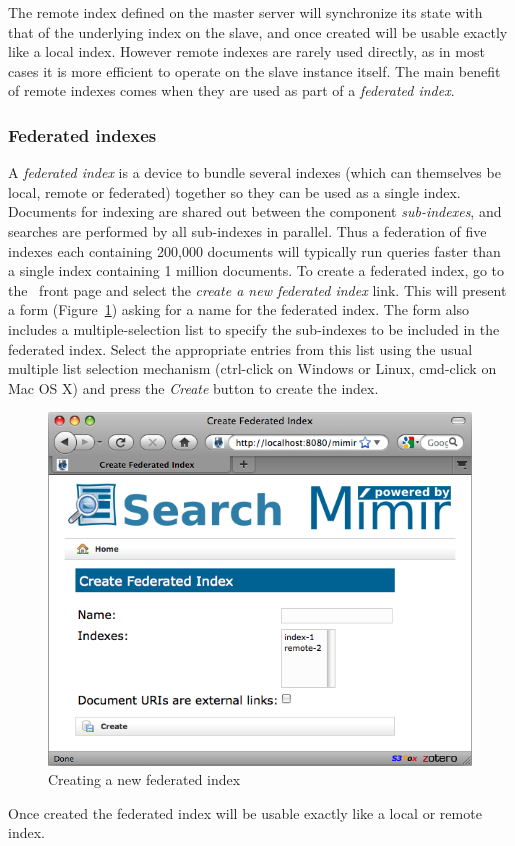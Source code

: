 The remote index defined on the master server will synchronize its state with
that of the underlying index on the slave, and once created will be usable
exactly like a local index.  However remote indexes are rarely used directly,
as in most cases it is more efficient to operate on the slave instance
itself.  The main benefit of remote indexes comes when they are used as part
of a {\em federated index}.

\subsubsection{Federated indexes}

A {\em federated index} is a device to bundle several indexes (which can
themselves be local, remote or federated) together so they can be used as a
single index.  Documents for indexing are shared out between the component
{\em sub-indexes}, and searches are performed by all sub-indexes in parallel.
Thus a federation of five indexes each containing 200,000 documents will
typically run queries faster than a single index containing 1 million
documents.  To create a federated index, go to the \Mimir\ front page and
select the {\em create a new federated index} link.  This will present a form
(Figure~\ref{fig:new-federated-index}) asking for a name for the federated
index.  The form also includes a multiple-selection list to specify the
sub-indexes to be included in the federated index.  Select the appropriate
entries from this list using the usual multiple list selection mechanism
(ctrl-click on Windows or Linux, cmd-click on Mac OS X) and press the
{\em Create} button to create the index.
%
\begin{figure}[htb!]
\begin{center}
\includegraphics[scale=0.5]{img/new-federated-index}
\end{center}
\caption{Creating a new federated index}
\label{fig:new-federated-index}
\end{figure}
%
Once created the federated index will be usable exactly like a local or remote
index.

